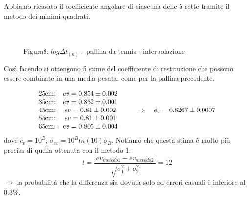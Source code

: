 \documentclass[a4paper]{article}
\theoremstyle{definition}
\begin{document}
	\noindent Abbiamo ricavato il coefficiente angolare di ciascuna delle 5 rette tramite il metodo dei minimi quadrati.\\\\\\
	\begin{figure}[!ht]
		\captionsetup{labelformat=empty}
		\caption{ Figura8: \(log\Delta t _{(n)}\) - pallina da tennis - interpolazione}
	\end{figure}
	
	\noindent Così facendo si ottengono 5 stime del coefficiente di restituzione che possono essere combinate in una media pesata, come per la pallina precedente.
	
	\[\begin{matrix}
		$25cm:$ & $\(ev = 0.854 \pm 0.002\)$ &  \\ 
		$35cm:$ & $\(ev = 0.832 \pm 0.001\)$ &  \\ 
		$45cm:$ & $\(ev = 0.81 \pm 0.002\)$ & $\(\qquad \Rightarrow \quad \bar{e_{v}} = 0.8267 \pm 0.0007\)$\\ 
		$55cm:$ & $\(ev = 0.81 \pm 0.001\)$ &  \\ 
		$65cm:$ & $\(ev = 0.805 \pm 0.004\)$ & 
	\end{matrix}\]
	dove \(e_{v}= 10^{B}\), \(\sigma_{ev} = 10^{B}ln(10)\sigma_{B}\). Notiamo che questa stima è molto più precisa di quella ottenuta con il metodo 1.
		\[t = \frac{ \left |ev_{metodo1}  - ev_{metodo2} \right |}{\sqrt{\sigma_{1}^{2}+ \sigma_{2}^{2}}} = 12  \]
	\noindent \(\rightarrow\) la probabilità che la differenza sia dovuta solo ad errori casuali è inferiore al 0.3\(\%\).
\end{document}
